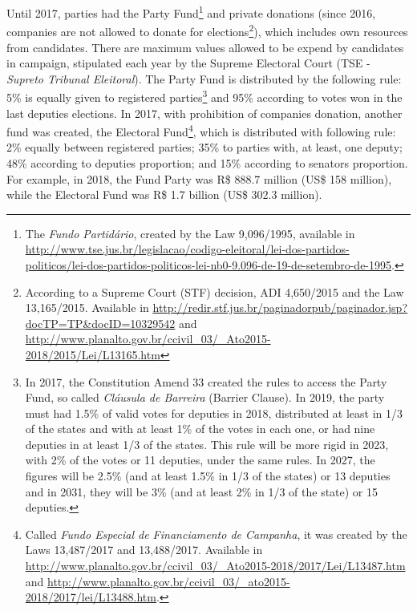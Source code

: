 \documentclass[
  12pt,
]{article}
\begin{document}
Until 2017, parties had the Party Fund\footnote{The \emph{Fundo
  Partidário}, created by the Law 9,096/1995, available in
  \url{http://www.tse.jus.br/legislacao/codigo-eleitoral/lei-dos-partidos-politicos/lei-dos-partidos-politicos-lei-nb0-9.096-de-19-de-setembro-de-1995}.}
and private donations (since 2016, companies are not allowed to donate
for elections\footnote{According to a Supreme Court (STF) decision, ADI
  4,650/2015 and the Law 13,165/2015. Available in
  \url{http://redir.stf.jus.br/paginadorpub/paginador.jsp?docTP=TP&docID=10329542}
  and
  \url{http://www.planalto.gov.br/ccivil_03/_Ato2015-2018/2015/Lei/L13165.htm}}),
which includes own resources from candidates. There are maximum values
allowed to be expend by candidates in campaign, stipulated each year by
the Supreme Electoral Court (TSE - \emph{Supreto Tribunal Eleitoral}).
The Party Fund is distributed by the following rule: 5\% is equally
given to registered parties\footnote{In 2017, the Constitution Amend 33
  created the rules to access the Party Fund, so called \emph{Cláusula
  de Barreira} (Barrier Clause). In 2019, the party must had 1.5\% of
  valid votes for deputies in 2018, distributed at least in 1/3 of the
  states and with at least 1\% of the votes in each one, or had nine
  deputies in at least 1/3 of the states. This rule will be more rigid
  in 2023, with 2\% of the votes or 11 deputies, under the same rules.
  In 2027, the figures will be 2.5\% (and at least 1.5\% in 1/3 of the
  states) or 13 deputies and in 2031, they will be 3\% (and at least 2\%
  in 1/3 of the state) or 15 deputies.} and 95\% according to votes won
in the last deputies elections. In 2017, with prohibition of companies
donation, another fund was created, the Electoral Fund\footnote{Called
  \emph{Fundo Especial de Financiamento de Campanha}, it was created by
  the Laws 13,487/2017 and 13,488/2017. Available in
  \url{http://www.planalto.gov.br/ccivil_03/_Ato2015-2018/2017/Lei/L13487.htm}
  and
  \url{http://www.planalto.gov.br/ccivil_03/_ato2015-2018/2017/lei/L13488.htm}.},
which is distributed with following rule: 2\% equally between registered
parties; 35\% to parties with, at least, one deputy; 48\% according to
deputies proportion; and 15\% according to senators proportion. For
example, in 2018, the Fund Party was R\$ 888.7 million (US\$ 158
million), while the Electoral Fund was R\$ 1.7 billion (US\$ 302.3
million).
\end{document}
